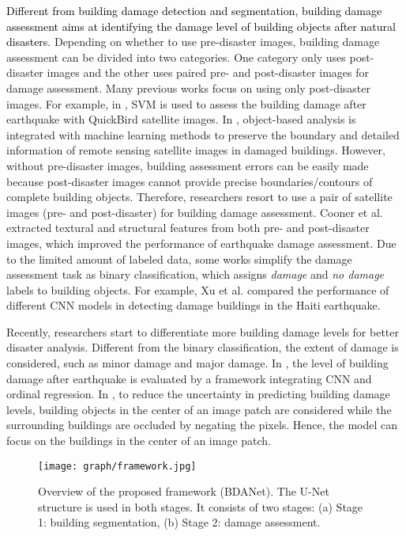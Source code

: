 \documentclass[journal]{IEEEtran}
\begin{document}
\textcolor{black}{Different from building damage detection and segmentation, building damage assessment aims at identifying the damage level of building objects after natural disasters.} Depending on whether to use pre-disaster images, building damage assessment can be divided into two categories. One category only uses post-disaster images and the other uses paired pre- and post-disaster images for damage assessment.
Many previous works focus on using only post-disaster images. For example, in \cite{liUrbanBuildingDamage2009}, SVM is used to assess the building damage after earthquake with QuickBird satellite images. 
In \cite{taskinkayaDamageAssessment20102011}, object-based analysis is integrated with machine learning methods to preserve the boundary and detailed information of remote sensing satellite images in damaged buildings. However, without pre-disaster images, building assessment errors can be easily made because post-disaster images cannot provide precise boundaries/contours of complete building objects. Therefore, researchers resort to use a pair of satellite images (pre- and post-disaster) for building damage assessment. Cooner et al. \cite{coonerDetectionUrbanDamage2016} extracted  textural and structural features from both pre- and post-disaster images, which  improved the  performance of earthquake damage assessment. Due to the limited amount of labeled data, some works simplify the damage assessment task as binary classification, which assigns \emph{damage} and \emph{no damage} labels to building objects. For example, Xu et al. \cite{xu2019building} compared the performance of different CNN models in detecting damage buildings in the Haiti earthquake. 






Recently, researchers start to differentiate more building damage levels for better disaster analysis. Different from the binary classification, the extent of damage is considered, such as minor damage and major damage. In \cite{nexStructuralBuildingDamage2019}, the level of building damage after earthquake is evaluated by a framework integrating CNN and ordinal regression. 
In \cite{presa-reyesAssessingBuildingDamage2020}, to reduce the uncertainty in predicting building damage levels, building objects in the center of an image patch are considered while the surrounding buildings are occluded by negating the pixels. Hence, the model can focus on the buildings in the center of an image patch.

\begin{figure*}[!t]
\centering
	\texttt{[image: graph/framework.jpg]}
\caption{Overview of the proposed framework (BDANet). The U-Net structure is used in both stages. It consists of two stages: (a) Stage 1: building segmentation, (b) Stage 2: damage assessment. }
\label{figFramework}
\end{figure*}
\end{document}
